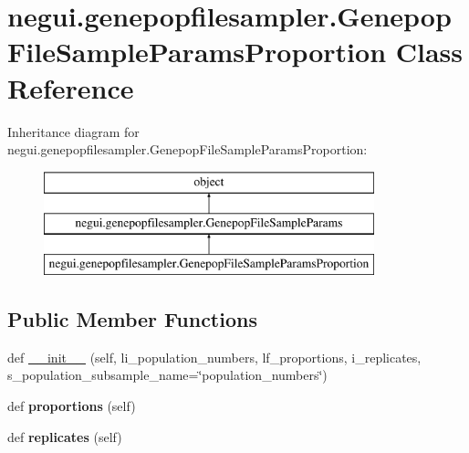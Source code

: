 \hypertarget{classnegui_1_1genepopfilesampler_1_1GenepopFileSampleParamsProportion}{}\section{negui.\+genepopfilesampler.\+Genepop\+File\+Sample\+Params\+Proportion Class Reference}
\label{classnegui_1_1genepopfilesampler_1_1GenepopFileSampleParamsProportion}
Inheritance diagram for negui.\+genepopfilesampler.\+Genepop\+File\+Sample\+Params\+Proportion\+:\begin{figure}[H]
\begin{center}
\leavevmode
\includegraphics[height=3.000000cm]{classnegui_1_1genepopfilesampler_1_1GenepopFileSampleParamsProportion}
\end{center}
\end{figure}
\subsection*{Public Member Functions}
\begin{DoxyCompactItemize}
\item 
def \hyperlink{classnegui_1_1genepopfilesampler_1_1GenepopFileSampleParamsProportion_a5458cb8a8b343e2e325d53196754e154}{\+\_\+\+\_\+init\+\_\+\+\_\+} (self, li\+\_\+population\+\_\+numbers, lf\+\_\+proportions, i\+\_\+replicates, s\+\_\+population\+\_\+subsample\+\_\+name=\char`\"{}population\+\_\+numbers\char`\"{})
\item 
def {\bfseries proportions} (self)\hypertarget{classnegui_1_1genepopfilesampler_1_1GenepopFileSampleParamsProportion_a0b564f11df13b230af1cb7a86e1376e1}{}\label{classnegui_1_1genepopfilesampler_1_1GenepopFileSampleParamsProportion_a0b564f11df13b230af1cb7a86e1376e1}

\item 
def {\bfseries replicates} (self)\hypertarget{classnegui_1_1genepopfilesampler_1_1GenepopFileSampleParamsProportion_a02f9dceade460e92110713f991fa86e5}{}\label{classnegui_1_1genepopfilesampler_1_1GenepopFileSampleParamsProportion_a02f9dceade460e92110713f991fa86e5}

\end{DoxyCompactItemize}


